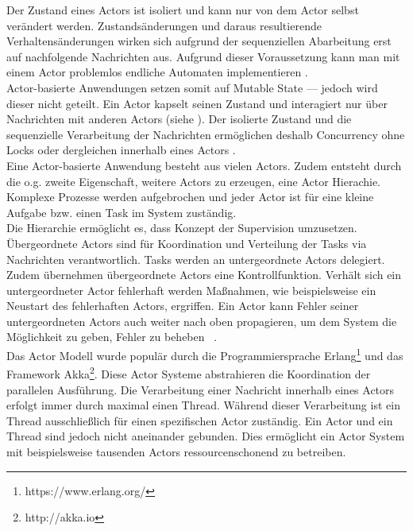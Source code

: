 Der Zustand eines Actors ist isoliert und kann nur von dem Actor selbst verändert werden. Zustandsänderungen und daraus resultierende Verhaltensänderungen wirken sich aufgrund der sequenziellen Abarbeitung erst auf nachfolgende Nachrichten aus. Aufgrund dieser Voraussetzung kann man mit einem Actor problemlos endliche Automaten implementieren \cite[S.~14]{vernon_reactive_2016} \cite[S.~84]{kuhn_reactive_2015}.\\
Actor-basierte Anwendungen setzen somit auf Mutable State --- jedoch wird dieser nicht geteilt. Ein Actor kapselt seinen Zustand und interagiert nur über Nachrichten mit anderen Actors (siehe ). Der isolierte Zustand und die sequenzielle Verarbeitung der Nachrichten ermöglichen deshalb Concurrency ohne Locks oder dergleichen innerhalb eines Actors \cite[S.~85]{kuhn_reactive_2015}.\\
Eine Actor-basierte Anwendung besteht aus vielen Actors. Zudem entsteht durch die o.g. zweite Eigenschaft, weitere Actors zu erzeugen, eine Actor Hierachie. Komplexe Prozesse werden aufgebrochen und jeder Actor ist für eine kleine Aufgabe bzw. einen Task im System zuständig.\\
Die Hierarchie ermöglicht es, dass Konzept der Supervision umzusetzen. Übergeordnete Actors sind für Koordination und Verteilung der Tasks via Nachrichten verantwortlich. Tasks werden an untergeordnete Actors delegiert. Zudem übernehmen übergeordnete Actors eine Kontrollfunktion. Verhält sich ein untergeordneter Actor fehlerhaft werden Maßnahmen, wie beispielsweise ein Neustart des fehlerhaften Actors, ergriffen. Ein Actor kann Fehler seiner untergeordneten Actors auch weiter nach oben propagieren, um dem System die Möglichkeit zu geben, Fehler zu beheben~\cite[S.~15]{vernon_reactive_2016} \cite[S.~83]{kuhn_reactive_2015} \cite[S.~86]{erb_concurrent_2012}.\\

Das Actor Modell wurde populär durch die Programmiersprache Erlang\footnote{https://www.erlang.org/} und das Framework Akka\footnote{http://akka.io}. Diese Actor Systeme abstrahieren die Koordination der parallelen Ausführung. Die Verarbeitung einer Nachricht innerhalb eines Actors erfolgt immer durch maximal einen Thread. Während dieser Verarbeitung ist ein Thread ausschließlich für einen spezifischen Actor zuständig. Ein Actor und ein Thread sind jedoch nicht aneinander gebunden. Dies ermöglicht ein Actor System mit beispielsweise tausenden Actors ressourcenschonend zu betreiben.

